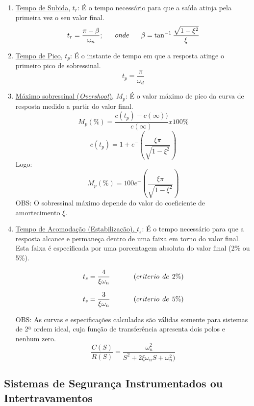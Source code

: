 \begin{enumerate}
    \item \underline{Tempo de Subida}, \textbf{\(t_r\)}: É o tempo necessário para que a saída atinja pela primeira vez o seu valor final.
    \newline
    \[t_r=\frac{\pi-\beta}{\omega_n}; \hspace{4ex} onde \hspace{4ex} \beta=\tan^{-1}\frac{\sqrt{1-\xi^2}}{\xi}\]
    \newline
    \item \underline{Tempo de Pico}, \textbf{\(t_p\)}: É o instante de tempo em que a resposta atinge o primeiro pico de sobressinal.
    \[t_p=\frac{\pi}{\omega_d}\]
    \newline
    \item \underline{Máximo sobressinal (\textit{Overshoot})}, \textbf{\(M_p\)}: É o valor máximo de pico da curva de resposta medido a partir do valor final.
    \[M_p(\%)=\frac{c(t_p)-c(\infty))}{c(\infty)}x100\%\]
    \[c(t_p)=1+e^-({\frac{\xi\pi}{\sqrt{1-\xi^2}}})\]
    Logo: \newline
    \[M_p(\%)=100e^-({\frac{\xi\pi}{\sqrt{1-\xi^2}}})\]
    OBS: O sobressinal máximo depende do valor do coeficiente de amortecimento \(\xi\).
    \newline
    \item \underline{Tempo de Acomodação (Estabilização), \(t_s\)}: É o tempo necessário para que a resposta alcance e permaneça dentro de uma faixa em torno do valor final. Esta faixa é especificada por uma porcentagem absoluta do valor final (2\% ou 5\%).
    
    \[t_s=\frac{4}{\xi\omega_n} \hspace{8ex} (criterio \hspace{1ex} de \hspace{1ex} 2\%)\]
    
    \[t_s=\frac{3}{\xi\omega_n} \hspace{8ex} (criterio \hspace{1ex} de \hspace{1ex} 5\%)\]
    
OBS: As curvas e especificações calculadas são válidas somente para sistemas de 2ª ordem ideal, cuja função de transferência apresenta dois polos e nenhum zero.
    \[\frac{C(S)}{R(S)}=\frac{\omega_n^2}{S^2+2\xi\omega_nS+\omega_n^2)}\]
\end{enumerate}

\subsection{Sistemas de Segurança Instrumentados ou Intertravamentos}

